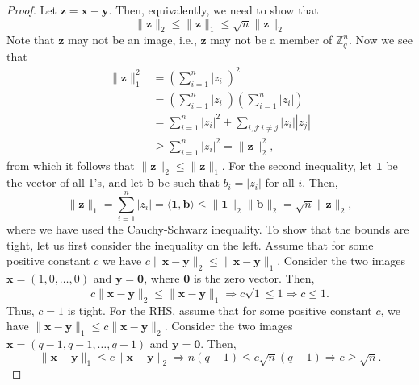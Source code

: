 \documentclass[10pt,a4paper]{amsart}
\newcommand{\norm}[1]{\lVert{#1}\rVert}
\newcommand{\vtr}[1]{\mathbf{#1}}
\begin{document}
\begin{proof}
Let $\vtr{z} = \vtr{x} - \vtr{y}$. Then, equivalently, we need to show that
\[
\norm{\vtr{z}}_2 \leq \norm{\vtr{z}}_1 \leq \sqrt{n}\norm{\vtr{z}}_2
\]
Note that $\vtr{z}$ may not be an image, i.e., $\vtr{z}$ may not be a member of $\mathbb{Z}_q^n$. Now we see that
\begin{align*}
  \norm{\vtr{z}}_1^2 &= \left( \sum_{i = 1}^n |z_i| \right)^2 \\
  &= \left( \sum_{i = 1}^n |z_i| \right) \left( \sum_{i = 1}^n |z_i| \right)\\
  &=  \sum_{i = 1}^n |z_i|^2  +  \sum_{i, j : i \neq j} |z_i||z_j| \\
  &\geq \sum_{i = 1}^n |z_i|^2 =  \norm{\vtr{z}}_2^2,
\end{align*}
from which it follows that $\norm{\vtr{z}}_2 \leq \norm{\vtr{z}}_1$. For the second inequality, let $\vtr{1}$ be the vector of all 1's, and let $\vtr{b}$ be such that $b_i = |z_i|$ for all $i$. Then,
\begin{equation*}
  \norm{\vtr{z}}_1 = \sum_{i=1}^n |z_i| = \langle \vtr{1}, \vtr{b} \rangle  \leq \norm{\vtr{1}}_2 \norm{\vtr{b}}_2 = \sqrt{n} \norm{\vtr{z}}_2,
\end{equation*}
where we have used the Cauchy-Schwarz inequality. To show that the bounds are tight, let us first consider the inequality on the left. Assume that for some positive constant $c$ we have $c \norm{\vtr{x} - \vtr{y}}_2 \leq \norm{\vtr{x} - \vtr{y}}_1$. Consider the two images $\vtr{x} = (1, 0, \ldots, 0)$ and $\vtr{y} = \vtr{0}$, where $\vtr{0}$ is the zero vector. Then,
\[
c \norm{\vtr{x} - \vtr{y}}_2 \leq \norm{\vtr{x} - \vtr{y}}_1 \Rightarrow c \sqrt{1} \leq 1 \Rightarrow c \leq 1.
\]
Thus, $c = 1$ is tight. For the RHS, assume that for some positive constant $c$, we have $ \norm{\vtr{x} - \vtr{y}}_1 \leq c \norm{\vtr{x} - \vtr{y}}_2$.  Consider the two images $\vtr{x} = (q-1, q-1, \ldots, q-1)$ and $\vtr{y} = \vtr{0}$. Then,
\[
\norm{\vtr{x} - \vtr{y}}_1 \leq c \norm{\vtr{x} - \vtr{y}}_2 \Rightarrow n(q-1) \leq c \sqrt{n}(q-1) \Rightarrow c \geq \sqrt{n}. 
\]
\end{proof}
\end{document}
